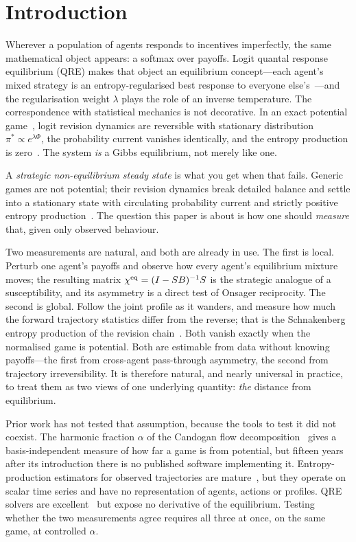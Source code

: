 \section{Introduction}
\label{sec:intro}

Wherever a population of agents responds to incentives imperfectly, the same mathematical
object appears: a softmax over payoffs. Logit quantal response equilibrium (QRE) makes that
object an equilibrium concept---each agent's mixed strategy is an entropy-regularised best
response to everyone else's~\cite{mckelvey1995,goeree2016}---and the regularisation weight
$\lambda$ plays the role of an inverse temperature. The correspondence with statistical
mechanics is not decorative. In an exact potential game~\cite{monderer1996}, logit revision
dynamics are reversible with stationary distribution $\pi^*\propto e^{\lambda\Phi}$, the
probability current vanishes identically, and the entropy production is
zero~\cite{blume1993}. The system \emph{is} a Gibbs equilibrium, not merely like one.

A \emph{strategic non-equilibrium steady state} is what you get when that fails. Generic
games are not potential; their revision dynamics break detailed balance and settle into a
stationary state with circulating probability current and strictly positive entropy
production~\cite{schnakenberg1976,seifert2012}. The question this paper is about is how one
should \emph{measure} that, given only observed behaviour.

Two measurements are natural, and both are already in use. The first is local. Perturb one
agent's payoffs and observe how every agent's equilibrium mixture moves; the resulting
matrix $\chi^{\mathrm{eq}}=(I-SB)^{-1}S$ is the strategic analogue of a susceptibility, and its
asymmetry is a direct test of Onsager reciprocity. The second is global. Follow the joint
profile as it wanders, and measure how much the forward trajectory statistics differ from
the reverse; that is the Schnakenberg entropy production of the revision
chain~\cite{schnakenberg1976}. Both vanish exactly when the normalised game is potential.
Both are estimable from data without knowing payoffs---the first from cross-agent
pass-through asymmetry, the second from trajectory irreversibility. It is therefore natural,
and nearly universal in practice, to treat them as two views of one underlying quantity:
\emph{the} distance from equilibrium.

Prior work has not tested that assumption, because the tools to test it did not coexist. The
harmonic fraction $\alpha$ of the Candogan flow decomposition~\cite{candogan2011} gives a
basis-independent measure of how far a game is from potential, but fifteen years after its
introduction there is no published software implementing it. Entropy-production estimators
for observed trajectories are mature~\cite{otsubo2022,seifert2026}, but they operate on
scalar time series and have no representation of agents, actions or profiles. QRE solvers
are excellent~\cite{turocy2005,gambit} but expose no derivative of the equilibrium. Testing
whether the two measurements agree requires all three at once, on the same game, at
controlled $\alpha$.

